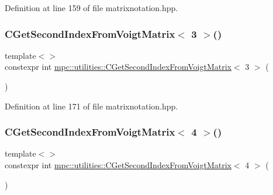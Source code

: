 Definition at line 159 of file matrixnotation.\+hpp.

\mbox{\label{namespacempc_1_1utilities_a1ab261832775728a8dd9aec99a9b8255}} 
\subsubsection{\texorpdfstring{C\+Get\+Second\+Index\+From\+Voigt\+Matrix$<$ 3 $>$()}{CGetSecondIndexFromVoigtMatrix< 3 >()}}
{\footnotesize\ttfamily template$<$$>$ \\
constexpr int \mbox{\hyperlink{namespacempc_1_1utilities_a094a324d81b996e8397336286264dfcd}{mpc\+::utilities\+::\+C\+Get\+Second\+Index\+From\+Voigt\+Matrix}}$<$ 3 $>$ (\begin{DoxyParamCaption}{ }\end{DoxyParamCaption})\hspace{0.3cm}{\ttfamily [inline]}}



Definition at line 171 of file matrixnotation.\+hpp.

\mbox{\label{namespacempc_1_1utilities_a2e002bb3ea9c528659336d38b86cbaf8}} 
\subsubsection{\texorpdfstring{C\+Get\+Second\+Index\+From\+Voigt\+Matrix$<$ 4 $>$()}{CGetSecondIndexFromVoigtMatrix< 4 >()}}
{\footnotesize\ttfamily template$<$$>$ \\
constexpr int \mbox{\hyperlink{namespacempc_1_1utilities_a094a324d81b996e8397336286264dfcd}{mpc\+::utilities\+::\+C\+Get\+Second\+Index\+From\+Voigt\+Matrix}}$<$ 4 $>$ (\begin{DoxyParamCaption}{ }\end{DoxyParamCaption})\hspace{0.3cm}{\ttfamily [inline]}}



